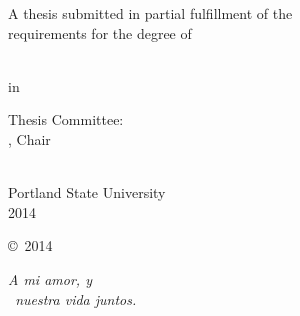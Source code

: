 \begin{SingleSpace}
\begin{center}
  A thesis submitted in partial fulfillment of the\\
  requirements for the degree of
\end{center}

\vfill

\begin{center}
  \thesisDegree\\
  in\\
  \thesisDept
\end{center}

\vfill

\begin{center}
  Thesis Committee:\\
  \thesisAdvisor, Chair\\
  \thesisCommitteeOne\\
  \thesisCommitteeTwo
\end{center}

\vfill

\begin{center}
    Portland State University\\
    2014
\end{center}
\end{SingleSpace}

\cleardoublepage  %
\thispagestyle{empty}

\begin{center}
    \vspace*{2.5 in}
    \copyright~2014 \thesisAuthor
\end{center}

\cleardoublepage


{}

\clearpage

{}
\vspace*{\fill}
\begin{flushright}
\SingleSpacing
{\sffamily\itshape A mi amor, y\\~nuestra vida juntos.}  %
\end{flushright}


\rmfamily
\normalfont



\clearpage
 

\begin{Spacing}{1.3}
\tableofcontents*  %



\clearpage
\listoftables

\clearpage
\listoffigures
\end{Spacing}




